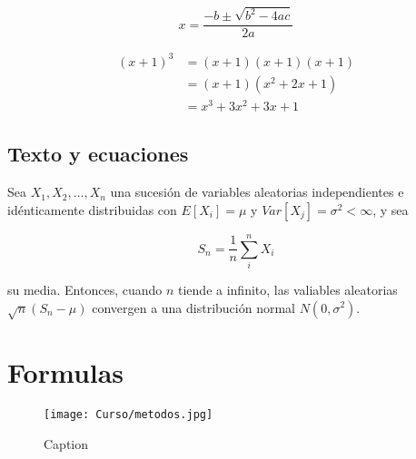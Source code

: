 \documentclass[12pt]{scrartcl}
\begin{document}
\begin{equation*}
    x = \frac{-b \pm \sqrt{b^2 -4ac}}
    {2a}
\end{equation*}

\begin{align*} %
(x+1)^3 & = (x+1)(x+1)(x+1)\\
&= (x+1)(x^2 + 2x + 1)\\
&= x^3 + 3x^2 + 3x +1
\end{align*}

\subsection*{Texto y ecuaciones} 
Sea $X_1, X_2, \ldots, X_n$ una sucesión de variables aleatorias independientes e idénticamente distribuidas con $E[X_i] = \mu $ y $Var[X_j] = \sigma^2 < \infty $, y sea 

\begin{equation}
    S_n = \frac{1}{n}\sum^n_iX_i
\end{equation}

su media. Entonces, cuando $n$ tiende a infinito, las valiables aleatorias $\sqrt{n}(S_n - \mu)$ convergen a una distribución normal $N(0,\sigma^2).$

\section{Formulas}
\begin{figure}[H]  %
    \centering
    \texttt{[image: Curso/metodos.jpg]}
    \caption{Caption}
    \label{fig:enter-label}
\end{figure}
\end{document}

